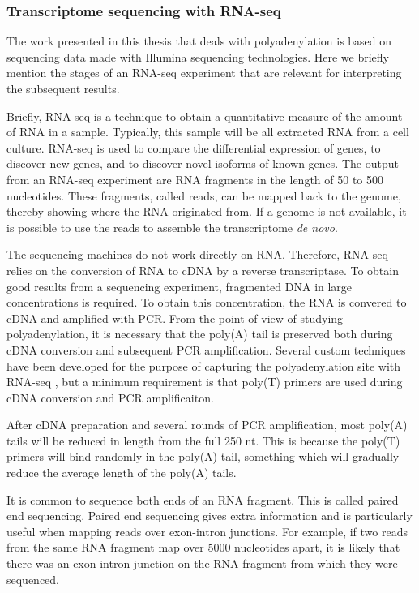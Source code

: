 %
\subsubsection{Transcriptome sequencing with RNA-seq}
The work presented in this thesis that deals with polyadenylation is based on
sequencing data made with Illumina sequencing technologies. Here we briefly
mention the stages of an RNA-seq experiment that are relevant for interpreting
the subsequent results.

Briefly, RNA-seq is a technique to obtain a quantitative measure of the amount
of RNA in a sample. Typically, this sample will be all extracted RNA from a
cell culture. RNA-seq is used to compare the differential expression of
genes, to discover new genes, and to discover novel isoforms of known genes.
The output from an RNA-seq experiment are RNA fragments in the length of
50 to 500 nucleotides. These fragments, called reads, can be mapped back to the
genome, thereby showing where the RNA originated from. If a genome is not
available, it is possible to use the reads to assemble the transcriptome
\textit{de novo}.

The sequencing machines do not work directly on RNA. Therefore, RNA-seq relies
on the conversion of RNA to cDNA by a reverse transcriptase. To obtain good
results from a sequencing experiment, fragmented DNA in large concentrations is
required. To obtain this concentration, the RNA is convered to cDNA and
amplified with PCR. From the point of view of studying polyadenylation,
it is necessary that the poly(A) tail is preserved both during cDNA conversion
and subsequent PCR amplification. Several custom techniques have been developed
for the purpose of capturing the polyadenylation site with RNA-seq
\cite{ozsolak_comprehensive_2010, derti_quantitative_2012}, but a minimum
requirement is that poly(T) primers are used during cDNA conversion and PCR
amplificaiton.

After cDNA preparation and several rounds of PCR amplification, most poly(A)
tails will be reduced in length from the full 250 nt. This is because the
poly(T) primers will bind randomly in the poly(A) tail, something which will
gradually reduce the average length of the poly(A) tails.

It is common to sequence both ends of an RNA fragment. This is called paired
end sequencing. Paired end sequencing gives extra information and is
particularly useful when mapping reads over exon-intron junctions. For example,
if two reads from the same RNA fragment map over 5000 nucleotides apart, it is
likely that there was an exon-intron junction on the RNA fragment from which
they were sequenced.

